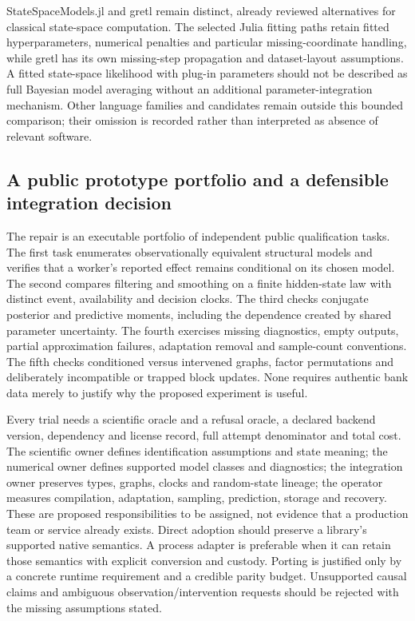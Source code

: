 StateSpaceModels.jl and gretl remain distinct, already reviewed alternatives for classical state-space computation. The selected Julia fitting paths retain fitted hyperparameters, numerical penalties and particular missing-coordinate handling, while gretl has its own missing-step propagation and dataset-layout assumptions. A fitted state-space likelihood with plug-in parameters should not be described as full Bayesian model averaging without an additional parameter-integration mechanism. Other language families and candidates remain outside this bounded comparison; their omission is recorded rather than interpreted as absence of relevant software.~\citep{exec25_odyn_ssm,exec25_odyn_gretl,exec25_odyn_choice,exec25_bsw_choice}

\subsection{A public prototype portfolio and a defensible integration decision}

The repair is an executable portfolio of independent public qualification tasks. The first task enumerates observationally equivalent structural models and verifies that a worker's reported effect remains conditional on its chosen model. The second compares filtering and smoothing on a finite hidden-state law with distinct event, availability and decision clocks. The third checks conjugate posterior and predictive moments, including the dependence created by shared parameter uncertainty. The fourth exercises missing diagnostics, empty outputs, partial approximation failures, adaptation removal and sample-count conventions. The fifth checks conditioned versus intervened graphs, factor permutations and deliberately incompatible or trapped block updates. None requires authentic bank data merely to justify why the proposed experiment is useful.~\citep{exec25_bsw_choice}

Every trial needs a scientific oracle and a refusal oracle, a declared backend version, dependency and license record, full attempt denominator and total cost. The scientific owner defines identification assumptions and state meaning; the numerical owner defines supported model classes and diagnostics; the integration owner preserves types, graphs, clocks and random-state lineage; the operator measures compilation, adaptation, sampling, prediction, storage and recovery. These are proposed responsibilities to be assigned, not evidence that a production team or service already exists. Direct adoption should preserve a library's supported native semantics. A process adapter is preferable when it can retain those semantics with explicit conversion and custody. Porting is justified only by a concrete runtime requirement and a credible parity budget. Unsupported causal claims and ambiguous observation/intervention requests should be rejected with the missing assumptions stated.~\citep{exec25_bsw_choice}

